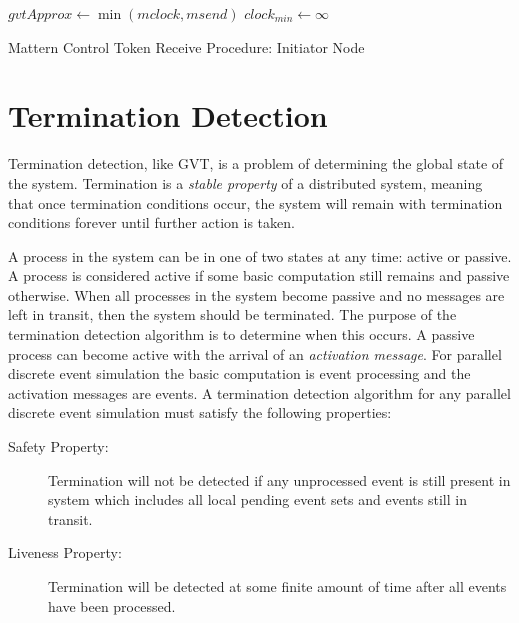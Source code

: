 \documentclass[11pt]{book}
\begin{document}
\begin{algorithm}
\DontPrintSemicolon
\SetAlgoVlined
{}
     {
        $gvtApprox \gets \min{(mclock, msend)}$\;
        \SendGVTUpdate{}\;
         
        $clock_{min} \gets \infty$\;
    } 
\caption{Mattern Control Token Receive Procedure: Initiator Node}\label{gvt_receive_init}
\end{algorithm}

\section{Termination Detection}

Termination detection, like GVT, is a problem of determining the global state of the system.
Termination is a \emph{stable property} of a distributed system, meaning that once termination
conditions occur, the system will remain with termination conditions forever until further
action is taken.

A process in the system can be in one of two states at any time: active or passive. A process
is considered active if some basic computation still remains and passive otherwise.
When all processes in the system become passive and no messages are left in transit, then
the system should be terminated. The purpose of the termination detection algorithm is to
determine when this occurs. A passive process can become active with the arrival of an
\emph{activation message}. For parallel discrete event simulation the basic computation is
event processing and the activation messages are events. A termination detection algorithm for
any parallel discrete event simulation must satisfy the following properties:

\begin{description}
    \item[Safety Property:] Termination will not be detected if any unprocessed event is still
        present in system which includes all local pending event sets and events still in transit.
    \item[Liveness Property:] Termination will be detected at some finite amount of time after
        all events have been processed.
\end{description}
\end{document}
